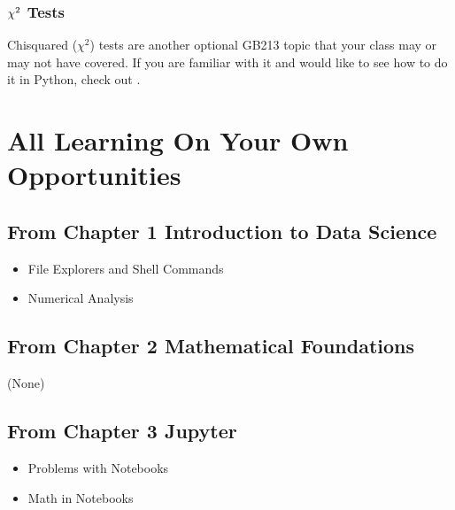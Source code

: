 \documentclass[letterpaper,10pt,english]{jupyterBook}
\begin{document}
\subsection{\protect\(\chi^2\protect\) Tests}
\label{\detokenize{GB213-review-in-Python:chi-2-tests}}
\sphinxAtStartPar
Chi\sphinxhyphen{}squared (\(\chi^2\)) tests are another optional GB213 topic that your class may or may not have covered.  If you are familiar with it and would like to see how to do it in Python, check out .


\chapter{All Learning On Your Own Opportunities}
\label{\detokenize{loyo-list:all-learning-on-your-own-opportunities}}\label{\detokenize{loyo-list::doc}}

\section{From Chapter 1 \sphinxhyphen{} Introduction to Data Science}
\label{\detokenize{loyo-list:from-chapter-1-introduction-to-data-science}}\begin{itemize}
\item {} 
\sphinxAtStartPar
File Explorers and Shell Commands

\item {} 
\sphinxAtStartPar
Numerical Analysis

\end{itemize}


\section{From Chapter 2 \sphinxhyphen{} Mathematical Foundations}
\label{\detokenize{loyo-list:from-chapter-2-mathematical-foundations}}
\sphinxAtStartPar
(None)


\section{From Chapter 3 \sphinxhyphen{} Jupyter}
\label{\detokenize{loyo-list:from-chapter-3-jupyter}}\begin{itemize}
\item {} 
\sphinxAtStartPar
Problems with Notebooks

\item {} 
\sphinxAtStartPar
Math in Notebooks

\end{itemize}
\end{document}
